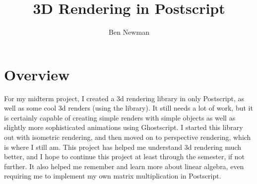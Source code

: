\documentclass[12pt]{article}
\title{3D Rendering in Postscript}
\author{Ben Newman}
\begin{document}
	\maketitle
	\newpage
	\section{Overview}
	For my midterm project, I created a 3d rendering library in only Postscript, as well as some cool 3d renders (using the library). It still needs a lot of work, but it is certainly capable of creating simple renders with simple objects as well as slightly more sophisticated animations using Ghostscript. I started this library out with isometric rendering, and then moved on to perspective rendering, which is where I still am. This project has helped me understand 3d rendering much better, and I hope to continue this project at least through the semester, if not further. It also helped me remember and learn more about linear algebra, even requiring me to implement my own matrix multiplication in Postscript.
\end{document}

